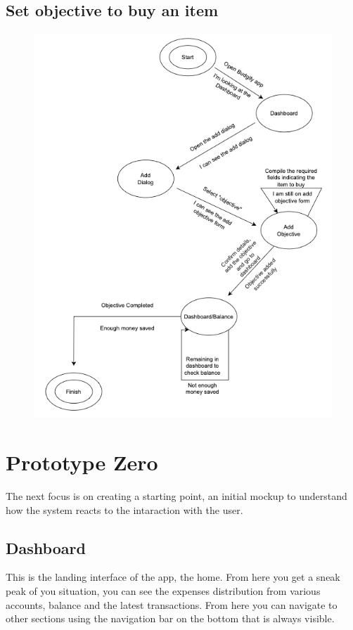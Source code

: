 \documentclass[a4paper,12pt]{article}
\begin{document}
\subsection{Set objective to buy an item}
\begin{figure}[H]
    \centering
    \includegraphics[scale=0.6]{STN2.png}
\end{figure}

\section{Prototype Zero}
The next focus is on creating a starting point, an initial mockup to understand how the system reacts to the intaraction with the user.
\subsection{Dashboard}
This is the landing interface of the app, the home. From here you get a sneak peak of you situation, you can see the expenses distribution from various accounts, balance and the latest transactions. From here you can navigate to other sections using the navigation bar on the bottom that is always visible.
\end{document}
